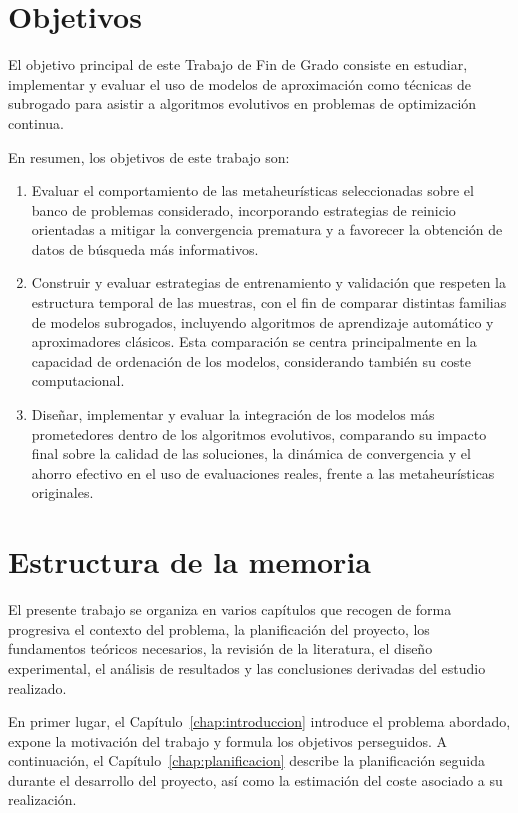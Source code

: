 \section{Objetivos}

El objetivo principal de este Trabajo de Fin de Grado consiste en estudiar, implementar y evaluar el uso de modelos de aproximación como técnicas de subrogado para asistir a algoritmos evolutivos en problemas de optimización continua.

En resumen, los objetivos de este trabajo son:

\begin{enumerate}
    \item Evaluar el comportamiento de las metaheurísticas seleccionadas sobre el banco de problemas considerado, incorporando estrategias de reinicio orientadas a mitigar la convergencia prematura y a favorecer la obtención de datos de búsqueda más informativos.

    \item Construir y evaluar estrategias de entrenamiento y validación que respeten la estructura temporal de las muestras, con el fin de comparar distintas familias de modelos subrogados, incluyendo algoritmos de aprendizaje automático y aproximadores clásicos. Esta comparación se centra principalmente en la capacidad de ordenación de los modelos, considerando también su coste computacional.

    \item Diseñar, implementar y evaluar la integración de los modelos más prometedores dentro de los algoritmos evolutivos, comparando su impacto final sobre la calidad de las soluciones, la dinámica de convergencia y el ahorro efectivo en el uso de evaluaciones reales, frente a las metaheurísticas originales.
\end{enumerate}

\section{Estructura de la memoria}

El presente trabajo se organiza en varios capítulos que recogen de forma
progresiva el contexto del problema, la planificación del proyecto, los
fundamentos teóricos necesarios, la revisión de la literatura, el diseño
experimental, el análisis de resultados y las conclusiones derivadas del
estudio realizado.

En primer lugar, el Capítulo~\ref{chap:introduccion} introduce el problema
abordado, expone la motivación del trabajo y formula los objetivos perseguidos.
A continuación, el Capítulo~\ref{chap:planificacion} describe la planificación
seguida durante el desarrollo del proyecto, así como la estimación del coste
asociado a su realización.

